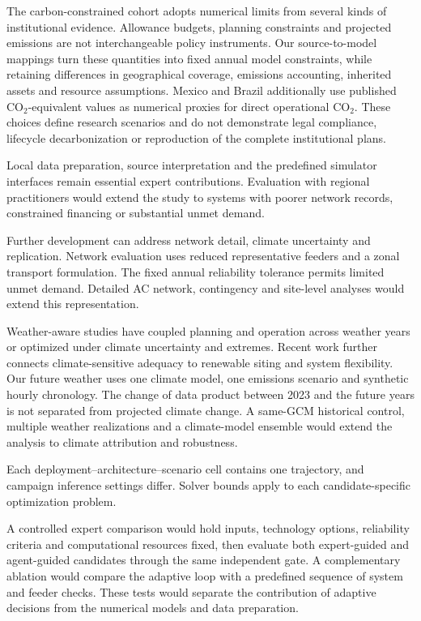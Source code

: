 \documentclass[pdflatex,sn-nature]{sn-jnl}
\begin{document}
The carbon-constrained cohort adopts numerical limits from several kinds of institutional evidence. Allowance budgets, planning constraints and projected emissions are not interchangeable policy instruments. Our source-to-model mappings turn these quantities into fixed annual model constraints, while retaining differences in geographical coverage, emissions accounting, inherited assets and resource assumptions. Mexico and Brazil additionally use published CO$_2$-equivalent values as numerical proxies for direct operational CO$_2$. These choices define research scenarios and do not demonstrate legal compliance, lifecycle decarbonization or reproduction of the complete institutional plans.

Local data preparation, source interpretation and the predefined simulator interfaces remain essential expert contributions. Evaluation with regional practitioners would extend the study to systems with poorer network records, constrained financing or substantial unmet demand.

Further development can address network detail, climate uncertainty and replication. Network evaluation uses reduced representative feeders and a zonal transport formulation. The fixed annual reliability tolerance permits limited unmet demand. Detailed AC network, contingency and site-level analyses would extend this representation.

Weather-aware studies have coupled planning and operation across weather years or optimized under climate uncertainty and extremes\cite{zeyringer2018weather,perera2020extremes}. Recent work further connects climate-sensitive adequacy to renewable siting and system flexibility\cite{qiu2026siting,zheng2025climateresilient}. Our future weather uses one climate model, one emissions scenario and synthetic hourly chronology. The change of data product between 2023 and the future years is not separated from projected climate change. A same-GCM historical control, multiple weather realizations and a climate-model ensemble would extend the analysis to climate attribution and robustness.

Each deployment--architecture--scenario cell contains one trajectory, and campaign inference settings differ. Solver bounds apply to each candidate-specific optimization problem.

A controlled expert comparison would hold inputs, technology options, reliability criteria and computational resources fixed, then evaluate both expert-guided and agent-guided candidates through the same independent gate. A complementary ablation would compare the adaptive loop with a predefined sequence of system and feeder checks. These tests would separate the contribution of adaptive decisions from the numerical models and data preparation.
\end{document}
